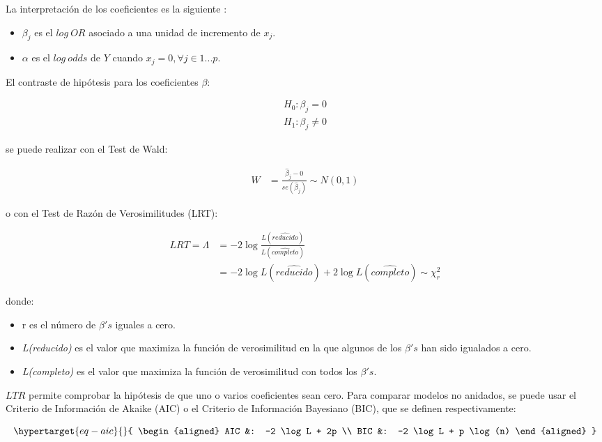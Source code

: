 \documentclass[
  12pt,
  a4paper,
  extrafontsizes,
  onecolumn,
  openright,
  table]{memoir}
\providecommand{\tightlist}{%
  \setlength{\itemsep}{0pt}\setlength{\parskip}{0pt}}\usepackage{longtable,booktabs,array}
\begin{document}
La interpretación de los coeficientes es la siguiente
\autocite[ver][p.~260]{frienly2015}:

\begin{itemize}
\tightlist
\item
  \(\beta_j\) es el \(log\ OR\) asociado a una unidad de incremento de
  \(x_j\).
\item
  \(\alpha\) es el \(log\ odds\) de \(Y\) cuando
  \(x_j=0, \forall j \in 1...p\).
\end{itemize}

El contraste de hipótesis para los coeficientes \(\beta\):

\[
\begin{aligned}
H_0: \beta_j =  0 \\
H_1: \beta_j \ne  0
\end{aligned}
\]

se puede realizar con el Test de Wald:

\[
\begin{aligned}
W & = \frac{\hat\beta_j - 0}{se(\hat\beta_j)} \sim N(0,1)
\end{aligned}
\]

o con el Test de Razón de Verosimilitudes (LRT):

\[
\begin{aligned}
LRT = \Lambda &= -2 \log \frac{L(\widehat{reducido})}{L(\widehat{completo})}\\
&= -2 \log L(\widehat{reducido}) + 2 \log L(\widehat{completo}) \sim \chi^2_r
\end{aligned}
\]

donde:

\begin{itemize}
\tightlist
\item
  r es el número de \(\beta's\) iguales a cero.
\item
  \emph{L(reducido)} es el valor que maximiza la función de
  verosimilitud en la que algunos de los \(\beta's\) han sido igualados
  a cero.
\item
  \emph{L(completo)} es el valor que maximiza la función de
  verosimilitud con todos los \(\beta's\).
\end{itemize}

\(LTR\) permite comprobar la hipótesis de que uno o varios coeficientes
sean cero. Para comparar modelos no anidados, se puede usar el Criterio
de Información de Akaike (AIC) o el Criterio de Información Bayesiano
(BIC), que se definen respectivamente:

\begin{equation}\protect\hypertarget{eq-aic}{}{
\begin{aligned}
AIC &: -2 \log L + 2p \\
BIC &: -2 \log L + p \log(n)
\end{aligned}
}\label{eq-aic}\end{equation}
\end{document}
